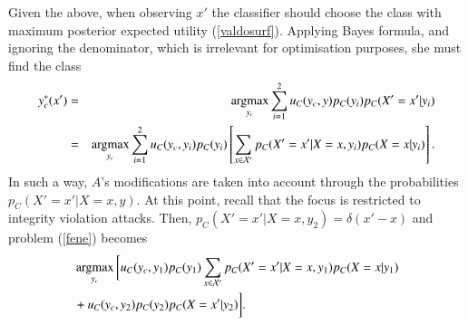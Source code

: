 

Given the above, when observing $x'$ the classifier should choose the class with maximum posterior expected utility (\ref{valdosurf}).
%
%
Applying Bayes formula, and ignoring the denominator, 
which is irrelevant for optimisation purposes, %
she must find the class %
%
\begin{eqnarray}\label{fene}
   y^*_c(x') &=& \operatorname*{argmax}_{y_c} \sum_{i=1}^2 u_C(y_c, y) p_C (y_i) p_C (X'=x'|y_i) \nonumber \\
    &=& \operatorname*{argmax}_{y_c} \sum_{i=1}^2  u_C(y_c, y_i) p_C (y_i) 
    \left[ \sum_{x \in \mathcal{X}'} p_C (X' = x'\vert X=x, y_i) p_C (X=x \vert y_i)\right] .   
\end{eqnarray}
%
In such a way, $A$'s modifications are taken into account through the probabilities $p_C(X' = x'\vert X=x, y)$.  
At this point, recall that the focus is restricted to integrity violation attacks.
Then, $p_C(X' = x'\vert X=x, y_2) = \delta(x'-x)$ and problem
 (\ref{fene}) becomes 
%
\begin{eqnarray} \label{pis}
   &\operatorname*{argmax}_{y_c} \bigg[ u_C(y_c, y_1) p_C(y_1)  \sum_{x \in \mathcal{X}'} p_C(X' = x'\vert X=x, y_1) p_C(X=x \vert y_1) \nonumber \\
   & + u_C(y_c, y_2) p_C(y_2) p_C(X=x' \vert y_2)\bigg].
\end{eqnarray} %
%
%

